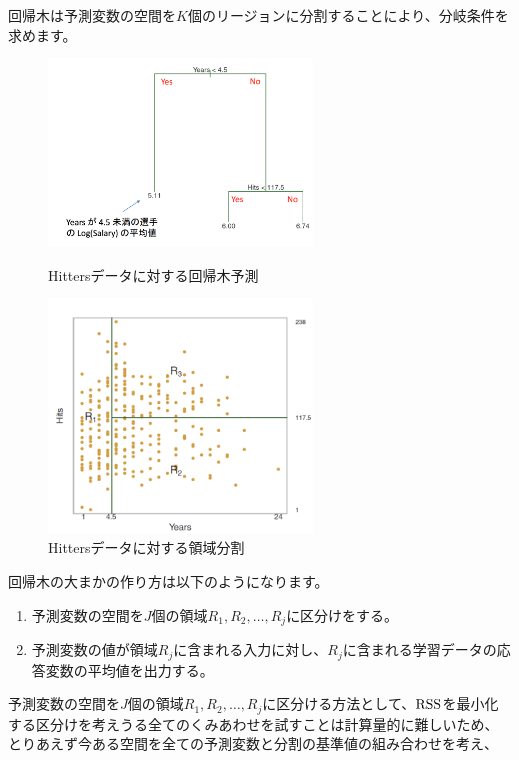 \documentclass[uplatex]{jsarticle}
\begin{document}
回帰木は予測変数の空間を$K$個のリージョンに分割することにより、分岐条件を求めます。
\begin{figure}[htbp]
\begin{minipage}{0.5\hsize}
 \begin{center}
  \includegraphics[width=70mm]{img/kaikiki.png}
 \end{center}
 \caption{Hittersデータに対する回帰木予測}
 \label{fig:one}
\end{minipage}
\begin{minipage}{0.5\hsize}
 \begin{center}
  \includegraphics[width=70mm]{img/hitters.png}
 \end{center}
 \caption{Hittersデータに対する領域分割}
 \label{fig:two}
\end{minipage}
\end{figure}
回帰木の大まかの作り方は以下のようになります。
\begin{enumerate}
  \item 予測変数の空間を$J$個の領域$R_1, R_2, \ldots , R_j$に区分けをする。
  \item 予測変数の値が領域$R_j$に含まれる入力に対し、$R_j$に含まれる学習データの応答変数の平均値を出力する。
\end{enumerate}
予測変数の空間を$J$個の領域$R_1, R_2, \ldots , R_j$に区分ける方法として、${\rm RSS}$を最小化する区分けを考えうる全てのくみあわせを試すことは計算量的に難しいため、とりあえず今ある空間を全ての予測変数と分割の基準値の組み合わせを考え、\
\end{document}

